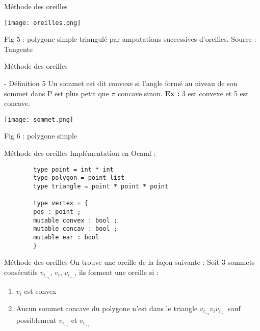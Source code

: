 \documentclass{beamer}
\begin{document}
\begin{frame}{Méthode des oreilles}
    \begin{center}
        \texttt{[image: oreilles.png]}
        
        Fig 5 : polygone simple triangulé par amputations successives d’oreilles.
        Source : Tangente
        
    \end{center}    
\end{frame}
\begin{frame}{Méthode des oreilles}
    \begin{block}{- Définition 5}
      Un sommet est dit convexe si l'angle formé au niveau de son sommet dans P est plus petit que $\pi$ concave sinon. \newline
      \textbf{Ex :} 3 est convexe et 5 est concave.
    \end{block}
    \begin{center}
        \texttt{[image: sommet.png]}
        
        Fig 6 : polygone simple
    \end{center}
\end{frame}
\begin{frame}[fragile]{Méthode des oreilles}
    Implémentation en Ocaml : \newline
    \begin{verbatim}
        type point = int * int 
        type polygon = point list 
        type triangle = point * point * point

        type vertex = {
        pos : point ;
        mutable convex : bool ;
        mutable concav : bool ;
        mutable ear : bool
        }
    \end{verbatim}   
\end{frame}
\begin{frame}{Méthode des oreilles}
    On trouve une oreille de la façon suivante : \newline\newline
    Soit 3 sommets consécutifs $v_i_-_1$, $v_i$, $v_i_+_1$, ils forment une oreille si :
    \begin{enumerate}
        \item <2-> $v_i$ est convex
        \item <3-> Aucun sommet concave du polygone n'est dans le triangle $v_i_-_1$$v_i$$v_i_+_1$ sauf possiblement $v_i_-_1$ et $v_i_+_1$     
    \end{enumerate}
\end{frame}
\end{document}
